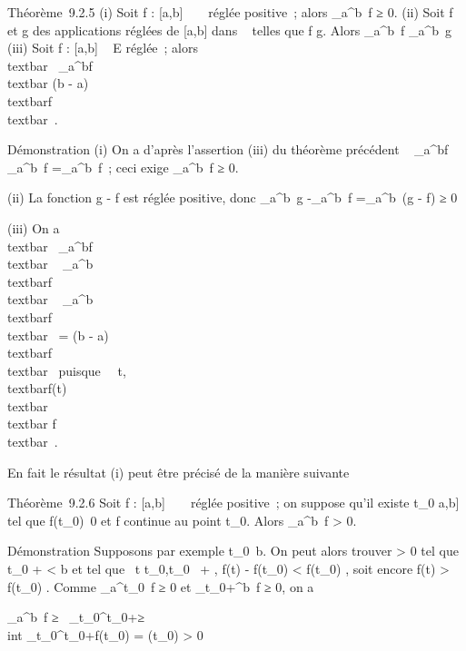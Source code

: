 \documentclass[]{article}
\begin{document}
Théorème~9.2.5 (i) Soit f : {[}a,b{]} \rightarrow~ ~ réglée positive~; alors
\int  \_a^b~f ≥ 0. (ii) Soit f et g
des applications réglées de {[}a,b{]} dans ~ telles que f \leq g. Alors
\int  \_a^b~f
\leq\int  \_a^b~g (iii) Soit f :
{[}a,b{]} \rightarrow~ E réglée~; alors
\\textbar{}\int ~
\_a^bf\\textbar{} \leq (b -
a)\\textbar{}f\\textbar{}\infty~.

Démonstration (i) On a d'après l'assertion (iii) du théorème précédent
\left \textbar{}\int ~
\_a^bf\right \textbar{}
\leq\int  \_a^b~\textbar{}f\textbar{}
=\int  \_a^b~f~; ceci exige
\int  \_a^b~f ≥ 0.

(ii) La fonction g - f est réglée positive, donc
\int  \_a^b~g
-\int  \_a^b~f
=\int  \_a^b~(g - f) ≥ 0

(iii) On a \\textbar{}\int ~
\_a^bf\\textbar{}
\leq\int ~
\_a^b\\textbar{}f\\textbar{}
\leq\int ~
\_a^b\\textbar{}f\\textbar{}\infty~
= (b - a)\\textbar{}f\\textbar{}\infty~ puisque
\forall~~t,
\\textbar{}f(t)\\textbar{}
\leq\\textbar{} f\\textbar{}\infty~.

En fait le résultat (i) peut être précisé de la manière suivante

Théorème~9.2.6 Soit f : {[}a,b{]} \rightarrow~ ~ réglée positive~; on suppose qu'il
existe t\_0 \in {[}a,b{]} tel que
f(t\_0)\neq~0 et f continue au point
t\_0. Alors \int  \_a^b~f
\textgreater{} 0.

Démonstration Supposons par exemple
t\_0\neq~b. On peut alors trouver \eta
\textgreater{} 0 tel que t\_0 + \eta \textless{} b et tel que
\forall~t \in {[}t\_0,t\_0~ + \eta{]},
\textbar{}f(t) - f(t\_0)\textbar{} \textless{} f(t\_0)
 , soit encore f(t) \textgreater{}
f(t\_0)  . Comme
\int  \_a^t\_0~f ≥ 0 et
\int  \_t\_0+\eta^b~f ≥ 0, on
a

\int  \_a^b~f
≥\int ~
\_t\_0^t\_0+\etaf ≥\\int
 \_t\_0^t\_0+\eta f(t\_0)
 = \etaf(t\_0) 
\textgreater{} 0
\end{document}
